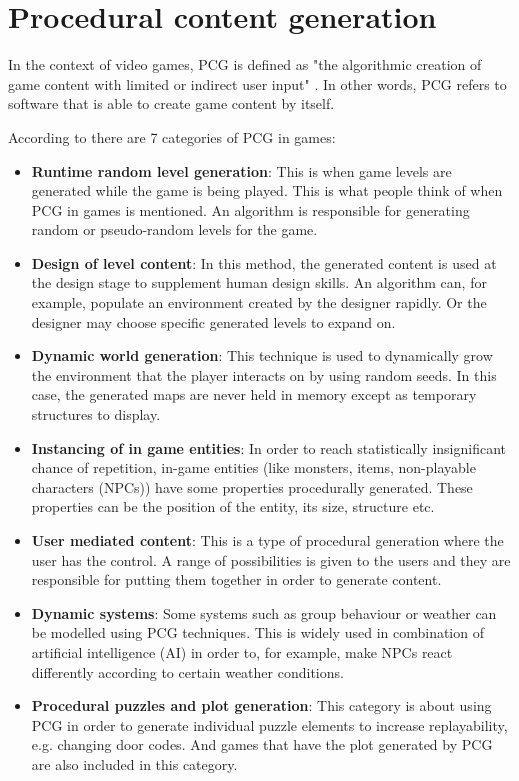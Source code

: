 \section{Procedural content generation}
\label{sec:pcg}

In the context of video games, PCG is defined as "the algorithmic creation of game content with
limited or indirect user input" \cite{togelius:2011}. In other words, PCG refers to software that is able to create game content by itself.

According to \cite{doull:2008} there are 7 categories of PCG in games:

\begin{itemize}
\item \textbf{Runtime random level generation}: This is when game levels are generated while the game is being played. This is what people think of when PCG in games is mentioned. An algorithm is responsible for generating random or pseudo-random levels for the game.

\item \textbf{Design of level content}: In this method, the generated content is used at the design stage to supplement human design skills. An algorithm can, for example, populate an environment created by the designer rapidly. Or the designer may choose specific generated levels to expand on.

\item \textbf{Dynamic world generation}: This technique is used to dynamically grow the environment that the player interacts on by using random seeds. In this case, the generated maps are never held in memory except as temporary structures to display.

\item \textbf{Instancing of in game entities}: In order to reach statistically insignificant chance of repetition, in-game entities (like monsters, items, non-playable characters (NPCs)) have some properties procedurally generated. These properties can be the position of the entity, its size, structure etc.

\item \textbf{User mediated content}: This is a type of procedural generation where the user has the control. A range of possibilities is given to the users and they are responsible for putting them together in order to generate content.

\item \textbf{Dynamic systems}: Some systems such as group behaviour or weather can be modelled using PCG techniques. This is widely used in combination of artificial intelligence (AI) in order to, for example, make NPCs react differently according to certain weather conditions.

\item \textbf{Procedural puzzles and plot generation}: This category is about using PCG in order to generate individual puzzle elements to increase replayability, e.g. changing door codes. And games that have the plot generated by PCG are also included in this category.
\end{itemize}

